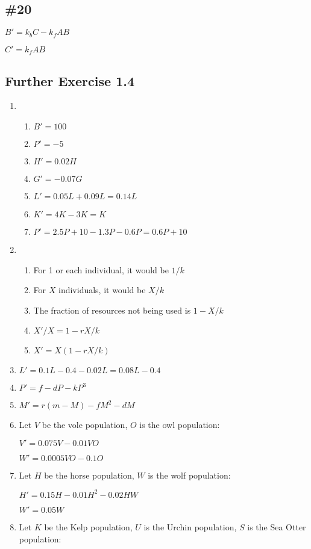 \documentclass[12pt]{article}
\begin{document}
\subsection*{\#20}
$B' = k_b C - k_f AB$

$C' = k_f AB$

\subsection*{Further Exercise 1.4}
\begin{enumerate}
    \item \begin{enumerate}[label=\alph*.]
        \item $B' = 100$
        \item $P' = -5$
        \item $H' = 0.02H$
        \item $G' = -0.07G$
        \item $L' = 0.05L + 0.09L = 0.14L$
        \item $K' = 4K - 3K = K$
        \item $P' = 2.5P + 10 - 1.3P - 0.6P = 0.6P + 10$
    \end{enumerate}
    \item \begin{enumerate}[label=\alph*.]
        \item For 1 or each individual, it would be $1/k$
        \item For $X$ individuals, it would be $X/k$
        \item The fraction of resources not being used is $1 - X/k$
        \item $X'/X = 1 - r X/k$
        \item $X' = X(1 - r X/k)$
    \end{enumerate}
    \item $L' = 0.1L - 0.4 - 0.02L = 0.08L - 0.4$
    \item $P' = f - dP - kP^3$
    \item $M' = r(m - M) -fM^2 -dM$
    \item Let $V$ be the vole population, $O$ is the owl population:
    
    $V' = 0.075V - 0.01VO$

    $W' = 0.0005VO - 0.1O$
    \item Let $H$ be the horse population, $W$ is the wolf population:
    
    $H' = 0.15H - 0.01H^2 - 0.02HW$

    $W' = 0.05W$
    \item Let $K$ be the Kelp population, $U$ is the Urchin population, $S$ is the Sea Otter population:
    

\end{enumerate}
\end{document}

